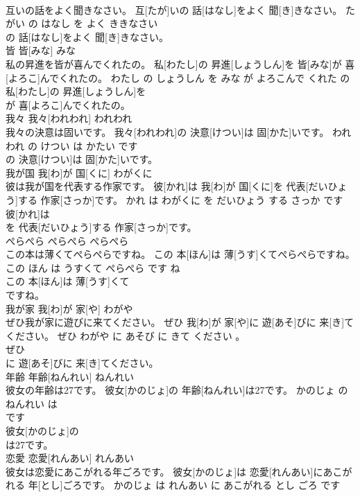 \documentclass[8pt]{extreport}
\begin{document}
\begin{CJK}{UTF8}{min}
\\	互いの話をよく聞きなさい。	互[たが]いの 話[はなし]をよく 聞[き]きなさい。	たがい の はなし を よく ききなさい	
\\	の 話[はなし]をよく 聞[き]きなさい。			
\\	皆	皆[みな]	みな	
\\	私の昇進を皆が喜んでくれたの。	私[わたし]の 昇進[しょうしん]を 皆[みな]が 喜[よろこ]んでくれたの。	わたし の しょうしん を みな が よろこんで くれた の	
\\	私[わたし]の 昇進[しょうしん]を
\\	が 喜[よろこ]んでくれたの。			
\\	我々	我々[われわれ]	われわれ	
\\	我々の決意は固いです。	我々[われわれ]の 決意[けつい]は 固[かた]いです。	われわれ の けつい は かたい です	
\\	の 決意[けつい]は 固[かた]いです。			
\\	我が国	我[わ]が 国[くに]	わがくに	
\\	彼は我が国を代表する作家です。	彼[かれ]は 我[わ]が 国[くに]を 代表[だいひょう]する 作家[さっか]です。	かれ は わがくに を だいひょう する さっか です	
\\	彼[かれ]は
\\	を 代表[だいひょう]する 作家[さっか]です。			
\\	ぺらぺら	ぺらぺら	ぺらぺら	
\\	この本は薄くてぺらぺらですね。	この 本[ほん]は 薄[うす]くてぺらぺらですね。	この ほん は うすくて ぺらぺら です ね	
\\	この 本[ほん]は 薄[うす]くて
\\	ですね。			
\\	我が家	我[わ]が 家[や]	わがや	
\\	ぜひ我が家に遊びに来てください。	ぜひ 我[わ]が 家[や]に 遊[あそ]びに 来[き]てください。	ぜひ わがや に あそび に きて ください 。	
\\	ぜひ
\\	に 遊[あそ]びに 来[き]てください。			
\\	年齢	年齢[ねんれい]	ねんれい	
\\	彼女の年齢は27です。	彼女[かのじょ]の 年齢[ねんれい]は27です。	かのじょ の ねんれい は 
\\	です	
\\	彼女[かのじょ]の
\\	は27です。			
\\	恋愛	恋愛[れんあい]	れんあい	
\\	彼女は恋愛にあこがれる年ごろです。	彼女[かのじょ]は 恋愛[れんあい]にあこがれる 年[とし]ごろです。	かのじょ は れんあい に あこがれる とし ごろ です	

\end{CJK}
\end{document}
